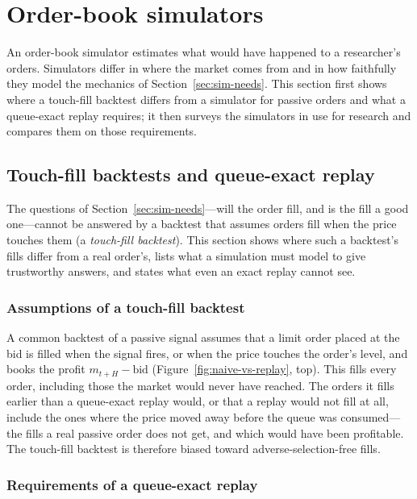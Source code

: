 \section{Order-book simulators}
\label{sec:simulators}

An order-book simulator estimates what would have happened to a researcher's orders. Simulators differ in where the
market comes from and in how faithfully they model the mechanics of Section~\ref{sec:sim-needs}. This section first
shows where a touch-fill backtest differs from a simulator for passive orders and what a queue-exact replay requires; it then
surveys the simulators in use for research and compares them on those requirements.

\subsection{Touch-fill backtests and queue-exact replay}
\label{sec:replay}

The questions of Section~\ref{sec:sim-needs}---will the order fill, and is the fill a good one---cannot be answered
by a backtest that assumes orders fill when the price touches them (a \emph{touch-fill backtest}). This section shows
where such a backtest's fills differ from a real order's, lists what a simulation must model to give trustworthy
answers, and states what even an exact replay cannot see.

\subsubsection{Assumptions of a touch-fill backtest}

A common backtest of a passive signal assumes that a limit order placed at the bid is filled when
the signal fires, or when the price touches the order's level, and books the profit $m_{t+H} - \text{bid}$
(Figure~\ref{fig:naive-vs-replay}, top). This fills every order, including those the market would never have reached. The orders it
fills earlier than a queue-exact replay would, or that a replay would not fill at all, include the ones where the price
moved away before the queue was consumed---the fills a real passive order does not get, and which would have been
profitable. The touch-fill backtest is therefore biased toward adverse-selection-free fills.

\subsubsection{Requirements of a queue-exact replay}

